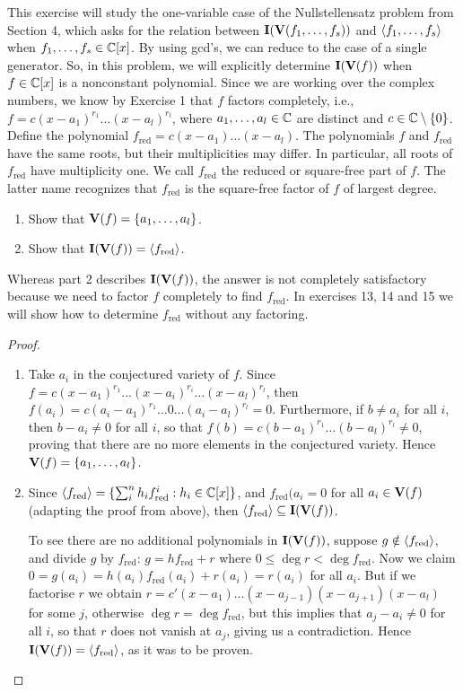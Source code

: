 \begin{exercise}{12}
This exercise will study the one-variable case of the Nullstellensatz problem from Section 4, which asks for the relation between $\mathbf{I}(\mathbf{V}(f_1,\dots,f_s))$ and $\langle f_1,\dots,f_s\rangle$ when $f_1,\dots,f_s\in\mathbb{C}[x]$. 
By using gcd's, we can reduce to the case of a single generator. 
So, in this problem, we will explicitly determine $\mathbf{I}(\mathbf{V}(f))$ when $f\in\mathbb{C}[x]$ is a nonconstant polynomial. 
Since we are working over the complex numbers, we know by Exercise 1 that $f$ factors completely, i.e., $f=c(x-a_1)^{r_1}\dots(x-a_l)^{r_l}$, where $a_1,\dots,a_l\in\mathbb{C}$ are distinct and $c\in\mathbb{C}\setminus\{0\}$. 
Define the polynomial $f_{\text{red}}=c(x-a_1)\dots(x-a_l)$. 
The polynomials $f$ and $f_{\text{red}}$ have the same roots, but their multiplicities may differ. 
In particular, all roots of $f_{\text{red}}$ have multiplicity one. 
We call $f_{\text{red}}$ the reduced or square-free part of $f$. 
The latter name recognizes that $f_{\text{red}}$ is the square-free factor of $f$ of largest degree.
\begin{enumerate}
    \item Show that $\mathbf{V}(f)=\{a_1,\dots,a_l\}$.
    \item Show that $\mathbf{I}(\mathbf{V}(f))=\langle f_{\text{red}}\rangle$.
\end{enumerate}
Whereas part 2 describes $\mathbf{I}(\mathbf{V}(f))$, the answer is not completely satisfactory because we need to factor $f$ completely to find $f_{\text{red}}$. 
In exercises 13, 14 and 15 we will show how to determine $f_{\text{red}}$ without any factoring.
\end{exercise}
\begin{proof}
\begin{enumerate}
    \item Take $a_i$ in the conjectured variety of $f$. 
    Since $f=c(x-a_1)^{r_1}\dots(x-a_i)^{r_i}\dots(x-a_l)^{r_l}$, then $f(a_i)=c(a_i-a_1)^{r_1}\dots 0\dots(a_i-a_l)^{r_l}=0$. 
    Furthermore, if $b\neq a_i$ for all $i$, then $b-a_i\neq 0$ for all $i$, so that $f(b)=c(b-a_1)^{r_1}\dots(b-a_l)^{r_l}\neq 0$, proving that there are no more elements in the conjectured variety. 
    Hence $\mathbf{V}(f)=\{a_1,\dots,a_l\}$.
    \item Since $\langle f_{\text{red}}\rangle = \{\sum_i^nh_if_{\text{red}}^i: h_i\in\mathbb{C}[x]\}$, and $f_{\text{red}}(a_i=0$ for all $a_i\in\mathbf{V}(f)$ (adapting the proof from above), then $\langle f_{\text{red}}\rangle\subseteq\mathbf{I}(\mathbf{V}(f))$. 
    
    To see there are no additional polynomials in $\mathbf{I}(\mathbf{V}(f))$, suppose $g\notin\langle f_{\text{red}}\rangle$, and divide $g$ by $f_{\text{red}}$: $g=hf_{\text{red}}+r$ where $0\leq\deg r<\deg f_{\text{red}}$. 
    Now we claim $0 =g(a_i) =h(a_i)f_{\text{red}}(a_i)+r(a_i) =r(a_i)$ for all $a_i$. 
    But if we factorise $r$ we obtain $r=c'(x-a_1)\dots(x-a_{j-1})(x-a_{j+1})(x-a_l)$ for some $j$, otherwise $\deg r=\deg f_{\text{red}}$, but this implies that $a_j-a_i\neq 0$ for all $i$, so that $r$ does not vanish at $a_j$, giving us a contradiction. 
    Hence $\mathbf{I}(\mathbf{V}(f))=\langle f_{\text{red}}\rangle$, as it was to be proven.
\end{enumerate}
\end{proof}

